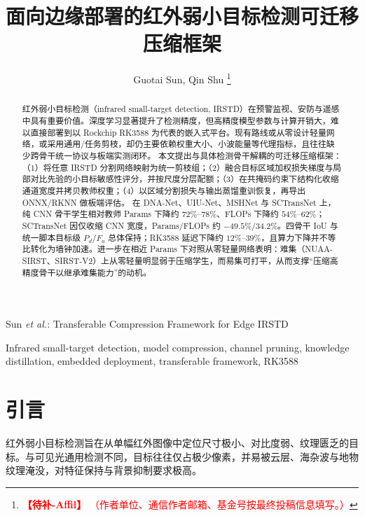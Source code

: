 \documentclass[lettersize,journal]{IEEEtran}
\newcommand{\ExpTodo}[2]{%
  \textcolor{red}{\textbf{【待补-#1】}}%
  \textcolor{red}{（#2）}%
}
\begin{document}
\title{面向边缘部署的红外弱小目标检测可迁移压缩框架}

\author{Guotai Sun, Qin Shu%
\thanks{\ExpTodo{Affil}{作者单位、通信作者邮箱、基金号按最终投稿信息填写。}}}

%
{Sun \MakeLowercase{\textit{et al.}}: Transferable Compression Framework for Edge IRSTD}

\maketitle

\begin{abstract}
红外弱小目标检测（infrared small-target detection, IRSTD）在预警监视、安防与遥感中具有重要价值。深度学习显著提升了检测精度，但高精度模型参数与计算开销大，难以直接部署到以 Rockchip RK3588 为代表的嵌入式平台。现有路线或从零设计轻量网络，或采用通用/任务剪枝，却仍主要依赖权重大小、小波能量等代理指标，且往往缺少跨骨干统一协议与板端实测闭环。
本文提出与具体检测骨干解耦的可迁移压缩框架：（1）将任意 IRSTD 分割网络映射为统一剪枝组；（2）融合目标区域加权损失梯度与局部对比先验的小目标敏感性评分，并按尺度分层配额；（3）在共掩码约束下结构化收缩通道宽度并拷贝教师权重；（4）以区域分割损失与输出蒸馏重训恢复，再导出 ONNX/RKNN 做板端评估。
在 DNA-Net、UIU-Net、MSHNet 与 SCTransNet 上，纯 CNN 骨干学生相对教师 Params 下降约 $72\%$--$78\%$、FLOPs 下降约 $54\%$--$62\%$；SCTransNet 因仅收缩 CNN 宽度，Params/FLOPs 约 $-49.5\%$/$34.2\%$。四骨干 IoU 与统一脚本目标级 $P_d$/$F_a$ 总体保持；RK3588 延迟下降约 $12\%$--$39\%$，且算力下降并不等比转化为墙钟加速。进一步在相近 Params 下对照从零轻量网络表明：难集（NUAA-SIRST、SIRST-V2）上从零轻量明显弱于压缩学生，而易集可打平，从而支撑“压缩高精度骨干以继承难集能力”的动机。
\end{abstract}

\begin{IEEEkeywords}
Infrared small-target detection, model compression, channel pruning, knowledge distillation, embedded deployment, transferable framework, RK3588
\end{IEEEkeywords}

\section{引言}
\label{sec:intro}
红外弱小目标检测旨在从单幅红外图像中定位尺寸极小、对比度弱、纹理匮乏的目标\cite{DNANet2023,ACM2021}。与可见光通用检测不同，目标往往仅占极少像素，并易被云层、海杂波与地物纹理淹没，对特征保持与背景抑制要求极高。
\end{document}
